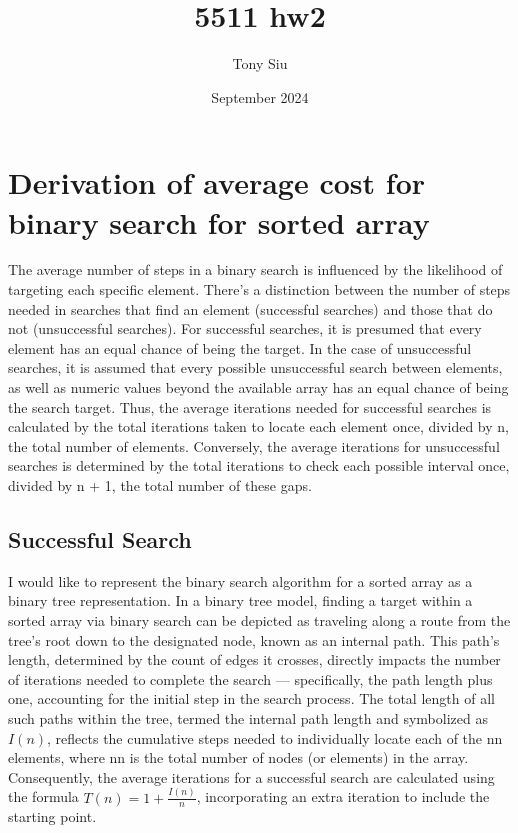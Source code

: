 \documentclass{article}
\title{5511 hw2}
\author{Tony Siu}
\date{September 2024}
\begin{document}
\maketitle
\section{Derivation of average cost for binary search for sorted array \cite{Knuth1998}\cite{chatgpt2024}}

\hspace{\parindent}The average number of steps in a binary search is influenced by the likelihood of targeting each specific element. There's a distinction between the number of steps needed in searches that find an element (successful searches) and those that do not (unsuccessful searches). For successful searches, it is presumed that every element has an equal chance of being the target. In the case of unsuccessful searches, it is assumed that every possible unsuccessful search between elements, as well as numeric values beyond the available array has an equal chance of being the search target. Thus, the average iterations needed for successful searches is calculated by the total iterations taken to locate each element once, divided by n, the total number of elements. Conversely, the average iterations for unsuccessful searches is determined by the total iterations to check each possible interval once, divided by n + 1, the total number of these gaps.

\subsection{Successful Search}

\hspace{\parindent}I would like to represent the binary search algorithm for a sorted array as a binary tree representation. In a binary tree model, finding a target within a sorted array via binary search can be depicted as traveling along a route from the tree's root down to the designated node, known as an internal path. This path's length, determined by the count of edges it crosses, directly impacts the number of iterations needed to complete the search — specifically, the path length plus one, accounting for the initial step in the search process. The total length of all such paths within the tree, termed the internal path length and symbolized as $I(n)$, reflects the cumulative steps needed to individually locate each of the nn elements, where nn is the total number of nodes (or elements) in the array. Consequently, the average iterations for a successful search are calculated using the formula $T(n) = 1 + \frac{I(n)}{n}$, incorporating an extra iteration to include the starting point. 
\end{document}

